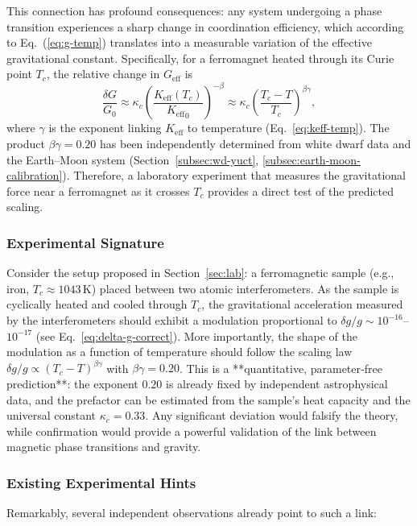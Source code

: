 \documentclass[12pt]{article}
\theoremstyle{remark}
\newcommand{\Keff}{K_{\mathrm{eff}}}
\begin{document}
	This connection has profound consequences: any system undergoing a phase transition experiences a sharp change in coordination efficiency, which according to Eq.~(\ref{eq:g-temp}) translates into a measurable variation of the effective gravitational constant. Specifically, for a ferromagnet heated through its Curie point \(T_c\), the relative change in \(G_{\mathrm{eff}}\) is
	\[
	\frac{\delta G}{G_0} \approx \kappa_c \left( \frac{\Keff(T_c)}{{\Keff}_{0}} \right)^{-\beta} \approx \kappa_c \left( \frac{T_c - T}{T_c} \right)^{\beta\gamma},
	\]
	where \(\gamma\) is the exponent linking \(\Keff\) to temperature (Eq.~\ref{eq:keff-temp}). The product \(\beta\gamma = 0.20\) has been independently determined from white dwarf data and the Earth–Moon system (Section~\ref{subsec:wd-yuct}, \ref{subsec:earth-moon-calibration}). Therefore, a laboratory experiment that measures the gravitational force near a ferromagnet as it crosses \(T_c\) provides a direct test of the predicted scaling.
	
	\subsubsection{Experimental Signature}
	
	Consider the setup proposed in Section~\ref{sec:lab}: a ferromagnetic sample (e.g., iron, \(T_c \approx 1043\,\mathrm{K}\)) placed between two atomic interferometers. As the sample is cyclically heated and cooled through \(T_c\), the gravitational acceleration measured by the interferometers should exhibit a modulation proportional to \(\delta g/g \sim 10^{-16}\)–\(10^{-17}\) (see Eq.~\ref{eq:delta-g-correct}). More importantly, the shape of the modulation as a function of temperature should follow the scaling law \(\delta g/g \propto (T_c - T)^{\beta\gamma}\) with \(\beta\gamma = 0.20\). This is a **quantitative, parameter‑free prediction**: the exponent \(0.20\) is already fixed by independent astrophysical data, and the prefactor can be estimated from the sample’s heat capacity and the universal constant \(\kappa_c = 0.33\). Any significant deviation would falsify the theory, while confirmation would provide a powerful validation of the link between magnetic phase transitions and gravity.
	
	\subsubsection{Existing Experimental Hints}
	
	Remarkably, several independent observations already point to such a link:
	
\end{document}
